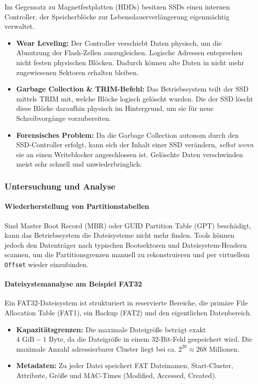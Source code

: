 \documentclass[
../../css_summary.tex,
]{subfiles}
\begin{document}
\begin{defbox}
  Im Gegensatz zu Magnetfestplatten (HDDs) besitzen SSDs einen internen Controller, der Speicherblöcke zur Lebensdauerverlängerung eigenmächtig verwaltet.
  \begin{itemize}
    \item \textbf{Wear Leveling:} Der Controller verschiebt Daten physisch, um die Abnutzung der Flash-Zellen auszugleichen. Logische Adressen entsprechen nicht festen physischen Blöcken. Dadurch können alte Daten in nicht mehr zugewiesenen Sektoren erhalten bleiben.
    \item \textbf{Garbage Collection \& TRIM-Befehl:} Das Betriebssystem teilt der SSD mittels TRIM mit, welche Blöcke logisch gelöscht wurden. Die  der SSD löscht diese Blöcke daraufhin physisch im Hintergrund, um sie für neue Schreibvorgänge vorzubereiten.
    \item \textbf{Forensisches Problem:} Da die Garbage Collection autonom durch den SSD-Controller erfolgt, kann sich der Inhalt einer SSD verändern, \textit{selbst wenn} sie an einen Writeblocker angeschlossen ist. Gelöschte Daten verschwinden meist sehr schnell und unwiederbringlich.
  \end{itemize}
\end{defbox}

\subsubsection{Untersuchung und Analyse}

\paragraph{Wiederherstellung von Partitionstabellen}
Sind Master Boot Record (MBR) oder GUID Partition Table (GPT) beschädigt, kann das Betriebssystem die Dateisysteme nicht mehr finden. Tools können jedoch den Datenträger nach typischen Bootsektoren und Dateisystem-Headern scannen, um die Partitionsgrenzen manuell zu rekonstruieren und per virtuellem \texttt{Offset} wieder einzubinden.

\paragraph{Dateisystemanalyse am Beispiel FAT32}
Ein FAT32-Dateisystem ist strukturiert in reservierte Bereiche, die primäre File Allocation Table (FAT1), ein Backup (FAT2) und den eigentlichen Datenbereich.
\begin{itemize}
  \item \textbf{Kapazitätsgrenzen:} Die maximale Dateigröße beträgt exakt $4 \text{ GiB} - 1 \text{ Byte}$, da die Dateigröße in einem 32-Bit-Feld gespeichert wird. Die maximale Anzahl adressierbarer Cluster liegt bei ca. $2^{28} \approx 268 \text{ Millionen}$.
  \item \textbf{Metadaten:} Zu jeder Datei speichert FAT Dateinamen, Start-Cluster, Attribute, Größe und MAC-Times (Modified, Accessed, Created).
\end{itemize}
\end{document}
